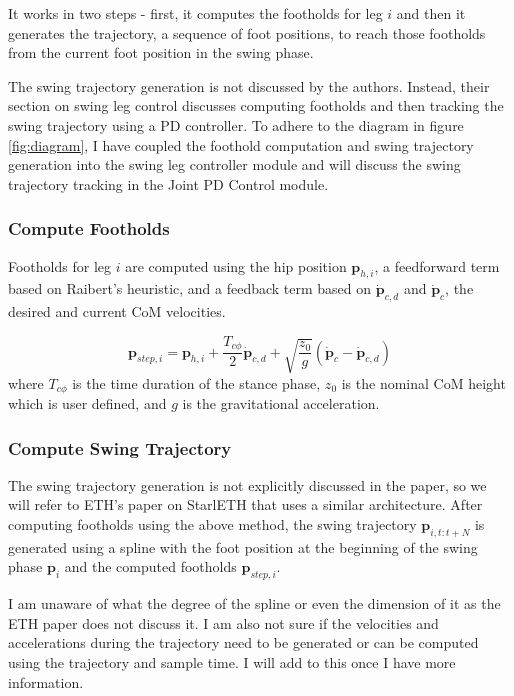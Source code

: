 \documentclass[12pt,a4paper]{article}
\theoremstyle{plain}
\theoremstyle{definition}
\theoremstyle{remark}
\newcounter{note}
\begin{document}
It works in two steps - first, it computes the footholds for leg $i$ and then it generates the trajectory, a sequence of foot positions, to reach those footholds from the current foot position in the swing phase.

\begin{note}
    The swing trajectory generation is not discussed by the authors. Instead, their section on swing leg control discusses computing footholds and then tracking the swing trajectory using a PD controller. To adhere to the diagram in figure \ref{fig:diagram}, I have coupled the foothold computation and swing trajectory generation into the swing leg controller module and will discuss the swing trajectory tracking in the Joint PD Control module.
    \label{note:swing-leg}
\end{note}

\subsubsection{Compute Footholds}

Footholds for leg $i$ are computed using the hip position $\mathbf{p}_{h,i}$, a feedforward term based on Raibert's heuristic, and a feedback term based on $\mathbf{\dot{p}}_{c,d}$ and $\mathbf{\dot{p}}_c$, the desired and current CoM velocities.

\[ \mathbf{p}_{step, i} = \mathbf{p}_{h,i} + \dfrac{T_{c\phi}}{2}\mathbf{\dot{p}}_{c,d} + \sqrt{\dfrac{z_0}{g}}(\mathbf{\dot{p}}_c - \mathbf{\dot{p}}_{c,d})\]
where $T_{c\phi}$ is the time duration of the stance phase, $z_0$ is the nominal CoM height which is user defined, and $g$ is the gravitational acceleration.

\subsubsection{Compute Swing Trajectory}

The swing trajectory generation is not explicitly discussed in the paper, so we will refer to ETH's paper on StarlETH that uses a similar architecture. After computing footholds using the above method, the swing trajectory $\mathbf{p}_{i, t:t+N}$ is generated using a spline with the foot position at the beginning of the swing phase $\mathbf{p}_i$ and the computed footholds $\mathbf{p}_{step, i}$.
\begin{note}
    I am unaware of what the degree of the spline or even the dimension of it as the ETH paper does not discuss it. I am also not sure if the velocities and accelerations during the trajectory need to be generated or can be computed using the trajectory and sample time. I will add to this once I have more information.
    \label{note:spline}
\end{note}
\end{document}

